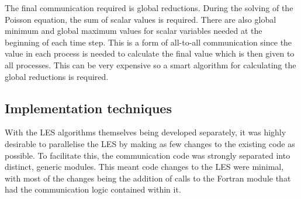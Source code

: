 The final communication required is global reductions. During the solving of the
Poisson equation, the sum of scalar values is required. There are also global
minimum and global maximum values for scalar variables needed at the beginning
of each time step. This is a form of all-to-all communication since the value in
each process is needed to calculate the final value which is then given to all
processes. This can be very expensive so a smart algorithm for calculating the
global reductions is required.

\subsection{Implementation techniques}

With the LES algorithms themselves being developed separately, it was highly
desirable to parallelise the LES by making as few changes to the existing code
as possible. To facilitate this, the communication code was strongly separated
into distinct, generic modules. This meant code changes to the LES were minimal,
with most of the changes being the addition of calls to the Fortran module that
had the communication logic contained within it.
